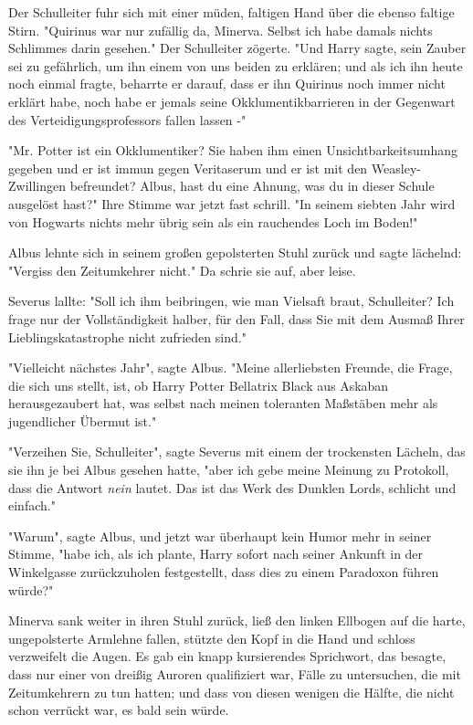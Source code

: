{Der Schulleiter fuhr sich mit einer müden, faltigen Hand über die ebenso faltige Stirn. "Quirinus war nur zufällig da, Minerva. Selbst ich habe damals nichts Schlimmes darin gesehen." Der Schulleiter zögerte. "Und Harry sagte, sein Zauber sei zu gefährlich, um ihn einem von uns beiden zu erklären; und als ich ihn heute noch einmal fragte, beharrte er darauf, dass er ihn Quirinus noch immer nicht erklärt habe, noch habe er jemals seine Okklumentikbarrieren in der Gegenwart des Verteidigungsprofessors fallen lassen -"

"Mr. Potter ist ein Okklumentiker? Sie haben ihm einen Unsichtbarkeitsumhang gegeben und er ist immun gegen Veritaserum und er ist mit den Weasley-Zwillingen befreundet? Albus, hast du eine Ahnung, was du in dieser Schule ausgelöst hast?" Ihre Stimme war jetzt fast schrill. "In seinem siebten Jahr wird von Hogwarts nichts mehr übrig sein als ein rauchendes Loch im Boden!"

Albus lehnte sich in seinem großen gepolsterten Stuhl zurück und sagte lächelnd: "Vergiss den Zeitumkehrer nicht." Da schrie sie auf, aber leise.

Severus lallte: "Soll ich ihm beibringen, wie man Vielsaft braut, Schulleiter? Ich frage nur der Vollständigkeit halber, für den Fall, dass Sie mit dem Ausmaß Ihrer Lieblingskatastrophe nicht zufrieden sind."

"Vielleicht nächstes Jahr", sagte Albus. "Meine allerliebsten Freunde, die Frage, die sich uns stellt, ist, ob Harry Potter Bellatrix Black aus Askaban herausgezaubert hat, was selbst nach meinen toleranten Maßstäben mehr als jugendlicher Übermut ist."

"Verzeihen Sie, Schulleiter", sagte Severus mit einem der trockensten Lächeln, das sie ihn je bei Albus gesehen hatte, "aber ich gebe meine Meinung zu Protokoll, dass die Antwort \emph{nein} lautet. Das ist das Werk des Dunklen Lords, schlicht und einfach."

"Warum", sagte Albus, und jetzt war überhaupt kein Humor mehr in seiner Stimme, "habe ich, als ich plante, Harry sofort nach seiner Ankunft in der Winkelgasse zurückzuholen festgestellt, dass dies zu einem Paradoxon führen würde?"

Minerva sank weiter in ihren Stuhl zurück, ließ den linken Ellbogen auf die harte, ungepolsterte Armlehne fallen, stützte den Kopf in die Hand und schloss verzweifelt die Augen. Es gab ein knapp kursierendes Sprichwort, das besagte, dass nur einer von dreißig Auroren qualifiziert war, Fälle zu untersuchen, die mit Zeitumkehrern zu tun hatten; und dass von diesen wenigen die Hälfte, die nicht schon verrückt war, es bald sein würde.

}
